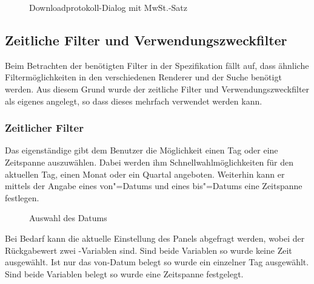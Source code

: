 \begin{figure}[htb]
	\centering
	\caption{Downloadprotokoll-Dialog mit MwSt.-Satz}
	\label{fig:alkis-protocol-new}
\end{figure}

\subsection{Zeitliche Filter und Verwendungszweckfilter}
Beim Betrachten der benötigten Filter in der Spezifikation fällt auf, dass ähnliche Filtermöglichkeiten in den verschiedenen Renderer und der Suche benötigt werden. Aus diesem Grund wurde der zeitliche Filter und Verwendungszweckfilter als eigenes  angelegt, so dass dieses mehrfach verwendet werden kann.

\subsubsection{Zeitlicher Filter}

Das eigenständige   gibt dem Benutzer die Möglichkeit einen Tag oder eine Zeitspanne auszuwählen.
Dabei werden ihm Schnellwahlmöglichkeiten für den aktuellen Tag, einen Monat oder ein Quartal angeboten.
Weiterhin kann er mittels der Angabe eines von"=Datums und eines bis"=Datums eine Zeitspanne festlegen.

\begin{wrapfigure}{o}{0.4\textwidth}
  \centering
  \caption{Auswahl des Datums} \label{fig:jxdatepicker} 
\end{wrapfigure}

Bei Bedarf kann die aktuelle Einstellung des Panels abgefragt werden, wobei der Rückgabewert zwei -Variablen sind.
Sind beide Variablen  so wurde keine Zeit ausgewählt.
Ist nur das von-Datum belegt so wurde ein einzelner Tag ausgewählt.
Sind beide Variablen belegt so wurde eine Zeitspanne festgelegt.

